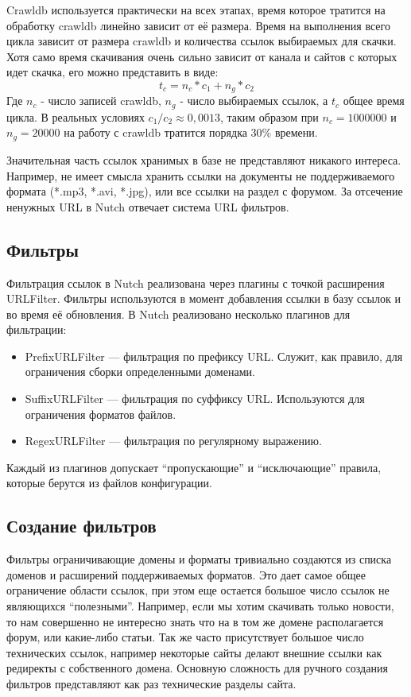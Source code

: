 Crawldb используется практически на всех этапах, время которое тратится на обработку crawldb линейно зависит от её размера. Время на выполнения всего цикла зависит от размера crawldb и количества ссылок выбираемых для скачки. Хотя само время скачивания очень сильно зависит от канала и сайтов с которых идет скачка, его можно представить в виде:
$$t_{c}=n_{c}*c_{1}+n_{g}*c_{2}$$ Где $n_{c}$ - число записей crawldb, $n_{g}$ - число выбираемых ссылок, а $t_{c}$ общее время цикла. В реальных условиях $c_{1}/c_{2}\approx 0,0013$, таким образом при $n_{c}=1000000$ и $n_{g}=20000$ на работу с crawldb тратится порядка 30\% времени. 

Значительная часть ссылок хранимых в базе не представляют никакого интереса. Например, не имеет смысла хранить ссылки на документы не поддерживаемого формата (*.mp3, *.avi, *.jpg), или все ссылки на раздел с форумом. За отсечение ненужных URL в Nutch отвечает система URL фильтров.

\subsection{Фильтры}
Фильтрация ссылок в Nutch реализована через плагины с точкой расширения URLFilter. Фильтры используются в момент добавления ссылки в базу ссылок и во время её обновления. В Nutch реализовано несколько плагинов для фильтрации:
\begin{itemize}
 \item PrefixURLFilter --- фильтрация по префиксу URL. Служит, как правило, для ограничения сборки определенными доменами.
 \item SuffixURLFilter --- фильтрация по суффиксу URL. Используются для ограничения форматов файлов.
 \item RegexURLFilter --- фильтрация по регулярному выражению. 
\end{itemize}

Каждый из плагинов допускает ``пропускающие'' и ``исключающие'' правила, которые берутся из файлов конфигурации. 

\subsection{Создание фильтров}
Фильтры ограничивающие домены и форматы тривиально создаются из списка доменов и расширений поддерживаемых форматов. Это дает самое общее ограничение области ссылок, при этом еще остается большое число ссылок не являющихся ``полезными''.
Например, если мы хотим скачивать только новости, то нам совершенно не интересно знать что на в том же домене располагается форум, или какие-либо статьи. Так же часто присутствует большое число технических ссылок, например некоторые сайты делают внешние ссылки как редиректы с собственного домена. Основную сложность для ручного создания фильтров представляют как раз технические разделы сайта.

